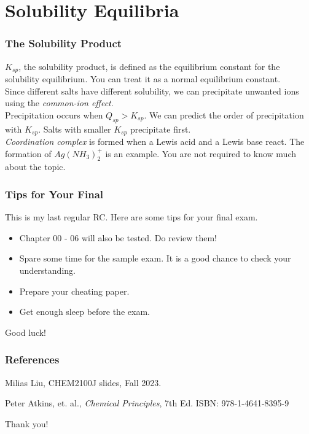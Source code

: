 \documentclass[aspectratio=169]{beamer}
\def\blankline{\\[12pt]}
\begin{document}
\section{Solubility Equilibria}
\begin{frame}
  \frametitle{The Solubility Product}
  $K_{sp}$, the solubility product, is defined as the equilibrium constant for the solubility equilibrium. You can treat it 
  as a normal equilibrium constant.
  \blankline
  Since different salts have different solubility, we can precipitate unwanted ions using the \textit{common-ion effect}.
  \blankline
  Precipitation occurs when $Q_{sp} > K_{sp}$. We can predict the order of precipitation with $K_{sp}$. Salts with smaller $K_{sp}$
  precipitate first.
  \blankline
  \textit{Coordination complex} is formed when a Lewis acid and a Lewis base react. The formation of $Ag(NH_3)_2^+$ is an example. 
  You are not required to know much about the topic.
\end{frame}
\begin{frame}
  \frametitle{Tips for Your Final}
  This is my last regular RC. Here are some tips for your final exam.
  \begin{itemize}
    \item Chapter 00 - 06 will also be tested. Do review them!
    \item Spare some time for the sample exam. It is a good chance to check your understanding.
    \item Prepare your cheating paper.
    \item Get enough sleep before the exam.
  \end{itemize}
  Good luck!
\end{frame}
\begin{frame}
  \frametitle{References}
  
  \begin{thebibliography}{99} %
  Milias Liu, CHEM2100J slides, Fall 2023.
    
  Peter Atkins, et. al., \textit{Chemical Principles}, 7th Ed. ISBN: 978-1-4641-8395-9
    
  \end{thebibliography}
\end{frame}

\begin{frame}
  \Huge{\centerline{Thank you!}}
\end{frame}
\end{document}
